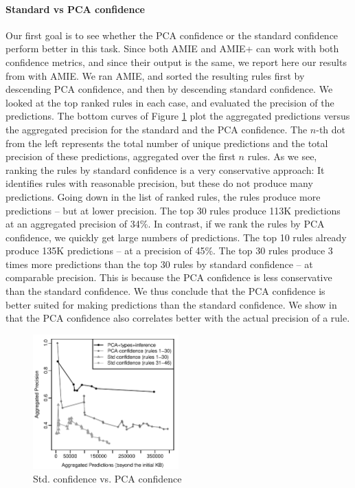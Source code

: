 \paragraph{Standard vs PCA confidence} Our first goal is to see whether the PCA confidence or the standard confidence perform better in this task. 
Since both AMIE and AMIE+ can work with both confidence metrics, and since their output is the same, we report here our results from \cite{amie} with AMIE. 
We ran AMIE, and sorted the resulting rules first by descending PCA confidence, and then by descending standard confidence. 
We looked at the top ranked rules in each case, and evaluated the precision of the predictions. 
The bottom curves of Figure \ref{finalshow} plot the aggregated predictions versus the aggregated precision for the standard and the PCA confidence.
The $n$-th dot from the left represents the total number of unique predictions and the total precision of these predictions,
aggregated over the first $n$ rules.
As we see, ranking the rules by standard confidence is a very conservative approach:
It identifies rules with reasonable precision, but these do not produce many predictions.
Going down in the list of ranked rules, the rules produce more predictions -- but at lower precision.
The top 30 rules produce 113K predictions at an aggregated precision of 34\%.
In contrast, if we rank the rules by PCA confidence, we quickly get large numbers of predictions. The top 10 rules already produce 135K predictions -- at a precision of 45\%.
The top 30 rules produce 3 times more predictions than the top 30 rules by standard confidence -- at comparable precision.
This is because the PCA confidence is less conservative than the standard confidence. 
We thus conclude that the PCA confidence is better suited for making predictions than the standard confidence. 
We show in \cite{amie} that the PCA confidence also correlates better with the actual precision of a rule.

\begin{figure}
\includegraphics[width=0.5\textwidth]{figures/std_vs_pca}
\caption{Std. confidence vs. PCA confidence}
\label{finalshow}
\end{figure}

